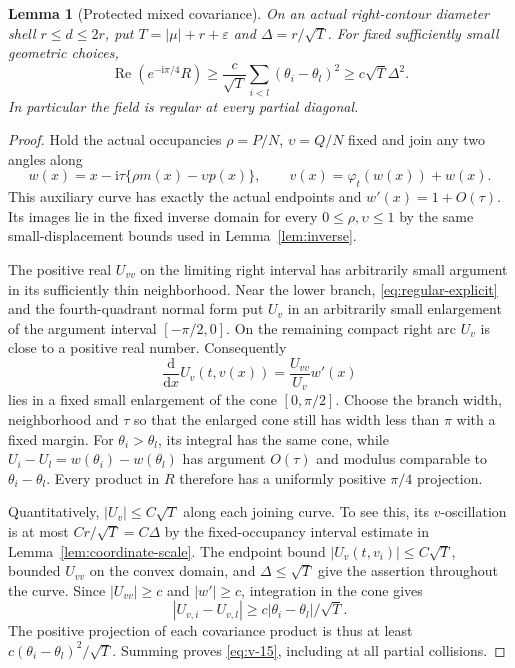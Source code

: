 \documentclass[11pt]{article}
\numberwithin{equation}{section}
\newtheorem{lemma}[theorem]{Lemma}
\theoremstyle{remark}\newtheorem{remark}[theorem]{Remark}
\newcommand{\ii}{\mathrm i}
\newcommand{\dd}{\mathrm d}
\newcommand{\Rea}{\operatorname{Re}}
\begin{document}
\begin{lemma}[Protected mixed covariance]\label{lem:covariance}
On an actual right-contour diameter shell $r\le d\le2r$, put
$T=|\mu|+r+\varepsilon$ and $\Delta=r/\sqrt T$.
For fixed sufficiently small geometric choices,
\begin{equation}\label{eq:v-15}
 \Rea(e^{-\ii\pi/4}R)
 \ge\frac c{\sqrt T}\sum_{i<l}(\theta_i-\theta_l)^2
 \ge c\sqrt T\Delta^2.
\end{equation}
In particular the field is regular at every partial diagonal.
\end{lemma}
\begin{proof}
Hold the actual occupancies $\rho=P/N$, $\upsilon=Q/N$ fixed and
join any two angles along
\[
 w(x)=x-\ii\tau\{\rho m(x)-\upsilon p(x)\},\qquad
 v(x)=\varphi_t(w(x))+w(x).
\]
This auxiliary curve has exactly the actual endpoints and
$w'(x)=1+O(\tau)$. Its images lie in the fixed inverse domain
for every $0\le\rho,\upsilon\le1$ by the same small-displacement
bounds used in Lemma~\ref{lem:inverse}.

The positive real $U_{vv}$ on the limiting right interval has
arbitrarily small argument in its sufficiently thin neighborhood.
Near the lower branch, \eqref{eq:regular-explicit} and the
fourth-quadrant normal form put $U_v$ in an arbitrarily small
enlargement of the argument interval $[-\pi/2,0]$.
On the remaining compact right arc $U_v$ is close to a positive
real number. Consequently
\[
 \frac{\dd}{\dd x}U_v(t,v(x))
       =\frac{U_{vv}}{U_v}w'(x)
\]
lies in a fixed small enlargement of the cone $[0,\pi/2]$.
Choose the branch width, neighborhood and $\tau$ so that the
enlarged cone still has width less than $\pi$ with a fixed margin.
For $\theta_i>\theta_l$, its integral has the same cone, while
$U_i-U_l=w(\theta_i)-w(\theta_l)$ has argument $O(\tau)$
and modulus comparable to $\theta_i-\theta_l$.
Every product in $R$ therefore has a uniformly positive
$\pi/4$ projection.

Quantitatively, $|U_v|\le C\sqrt T$ along each joining curve.
To see this, its $v$-oscillation is at most $C r/\sqrt T=C\Delta$
by the fixed-occupancy interval estimate in
Lemma~\ref{lem:coordinate-scale}. The endpoint bound
$|U_v(t,v_i)|\le C\sqrt T$, bounded $U_{vv}$ on the convex
domain, and $\Delta\le\sqrt T$ give the assertion throughout
the curve. Since $|U_{vv}|\ge c$ and $|w'|\ge c$, integration
in the cone gives
\[
 |U_{v,i}-U_{v,l}|\ge c|\theta_i-\theta_l|/\sqrt T.
\]
The positive projection of each covariance product is thus at least
$c(\theta_i-\theta_l)^2/\sqrt T$.
Summing proves \eqref{eq:v-15}, including at all partial collisions.
\end{proof}
\end{document}
